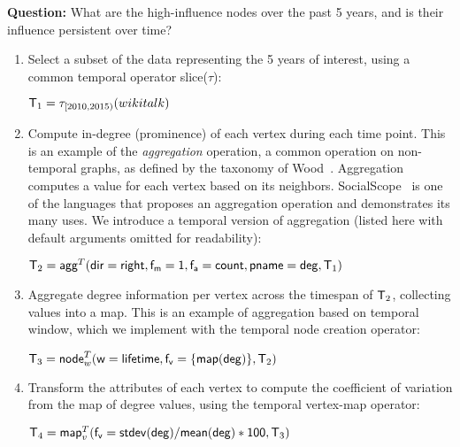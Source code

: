 {\bf Question:} What are the high-influence nodes over the past 5
years, and is their influence persistent over time?

\begin{enumerate}[noitemsep,itemindent=\dimexpr\labelwidth+\labelsep\relax,leftmargin=0pt]
\item Select a subset of the data representing the 5 years of
  interest, using a common temporal operator slice($\tau$):

\begin{center}
$\mathsf{T}_1 = \tau_{[2010,2015)}(wikitalk)$
\end{center}

\item Compute in-degree (prominence) of each vertex during each time
  point.  This is an example of the {\em aggregation} operation, a
  common operation on non-temporal graphs, as defined by the taxonomy
  of Wood~\cite{Wood2012}.  Aggregation computes a value for each
  vertex based on its neighbors.  SocialScope~\cite{Amer-Yahia2009} is
  one of the languages that proposes an aggregation operation and
  demonstrates its many uses.  We introduce a temporal version of
  aggregation (listed here with default arguments omitted for
  readability):

\begin{center}
$\mathsf{T}_2 = \textsf{agg}^T(\mathsf{dir=right},\mathsf{f_m=1},\mathsf{f_a=count},\mathsf{pname=deg},\mathsf{T}_1)$
\end{center}

\item Aggregate degree information per vertex across the timespan
  of $\mathsf{T}_2$, collecting values into a map.  This is an example of
  aggregation based on temporal window, which we implement with the
  temporal node creation operator:

\begin{center}
$\mathsf{T}_3 =\textsf{node}^T_w(\mathsf{w=lifetime},\mathsf{f_v=\{map(deg)\}},\mathsf{T}_2)$
\end{center}

\item Transform the attributes of each vertex to compute the
  coefficient of variation from the map of degree values, using the
  temporal vertex-map operator:

\begin{center}
$\mathsf{T}_4 = \textsf{map}^T_v(\mathsf{f_v=stdev(deg)/mean(deg)*100}, \mathsf{T}_3)$
\end{center}

\end{enumerate}


